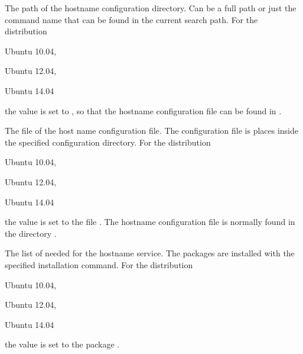 
The path of the hostname configuration directory. Can be a full path or
just the command name that can be found in the current search path.
For the distribution
\begin{inparaitem}
\item[\TheDistribution{ubuntu}] Ubuntu 10.04,
\item[\TheDistribution{ubuntu}] Ubuntu 12.04,
\item[\TheDistribution{ubuntu}] Ubuntu 14.04
\end{inparaitem}
the value is set to , so that the hostname configuration
file can be found in .


The file  of the host name configuration file. The configuration file
is places inside the specified configuration directory.
For the distribution
\begin{inparaitem}
\item[\TheDistribution{ubuntu}] Ubuntu 10.04,
\item[\TheDistribution{ubuntu}] Ubuntu 12.04,
\item[\TheDistribution{ubuntu}] Ubuntu 14.04
\end{inparaitem}
the value is set to the file . The hostname configuration
file is normally found in the directory .


The list of  needed for the hostname service. The packages
are installed with the specified installation command.
For the distribution
\begin{inparaitem}
\item[\TheDistribution{ubuntu}] Ubuntu 10.04,
\item[\TheDistribution{ubuntu}] Ubuntu 12.04,
\item[\TheDistribution{ubuntu}] Ubuntu 14.04
\end{inparaitem}
the value is set to the package .


